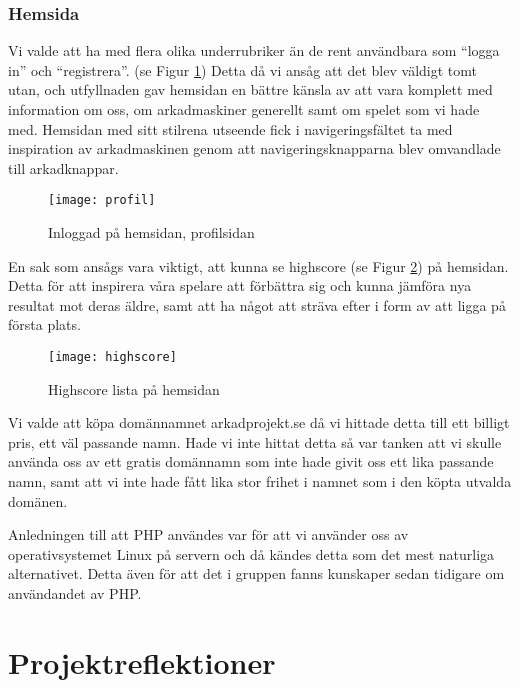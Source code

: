 \documentclass[12pt,fleqn,openany]{book} %
\begin{document}
\subsection{Hemsida}

Vi valde att ha med flera olika underrubriker än de rent användbara som “logga in” och “registrera”. (se Figur \ref{fig_profilsida})
Detta då vi ansåg att det blev väldigt tomt utan, och utfyllnaden gav hemsidan en bättre känsla av att vara komplett med information om 
oss, om arkadmaskiner generellt samt om spelet som vi hade med. Hemsidan med sitt stilrena utseende fick i navigeringsfältet ta med inspiration av arkadmaskinen genom att navigeringsknapparna blev 
omvandlade till arkadknappar. 

\begin{figure}[h]
\centering\texttt{[image: profil]}
\caption{Inloggad på hemsidan, profilsidan}
\label{fig_profilsida}
\end{figure}

En sak som ansågs vara viktigt, att kunna se highscore (se Figur \ref{fig_highscore}) på hemsidan. Detta för att inspirera våra spelare att förbättra sig och kunna
jämföra nya resultat mot deras äldre, samt att ha något att sträva efter i form av att ligga på första plats.

\begin{figure}[!h]
\centering\texttt{[image: highscore]}
\caption{Highscore lista på hemsidan}
\label{fig_highscore}
\end{figure}

Vi valde att köpa domännamnet arkadprojekt.se då vi hittade detta till ett billigt pris, ett väl passande namn. Hade vi inte hittat
detta så var tanken att vi skulle använda oss av ett gratis domännamn som inte hade givit oss ett lika passande namn, samt att vi inte
hade fått lika stor frihet i namnet som i den köpta utvalda domänen.  

Anledningen till att PHP användes var för att vi använder oss av operativsystemet Linux på servern och då kändes detta som det mest 
naturliga alternativet. Detta även för att det i gruppen fanns kunskaper sedan tidigare om användandet av PHP.


\chapter{Projektreflektioner}
\end{document}
